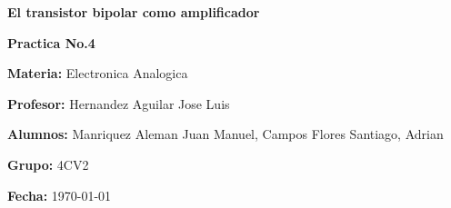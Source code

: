 \begin{titlepage}
    {\Huge \textbf{El transistor bipolar como amplificador} \par}
    \vspace{0.5cm}
    
    {\Large\textbf{Practica No.4}\par}
    \vspace*{1.5cm}


    \vspace{2cm}

    \begin{flushleft}
        {\large \textbf{Materia:} Electronica Analogica\par}
        \vspace{0.5cm}
        {\large \textbf{Profesor:} Hernandez Aguilar Jose Luis \par}
        \vspace{0.5cm}
        {\large \textbf{Alumnos:} Manriquez Aleman Juan Manuel, Campos Flores
        Santiago, Adrian \par}
        \vspace{0.5cm}
        {\large \textbf{Grupo:} 4CV2 \par}
        \vspace{0.5cm}
        {\large \textbf{Fecha:} \today \par}
    \end{flushleft}

    \vfill
\end{titlepage}
